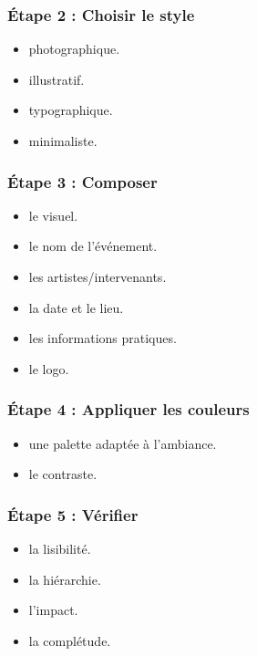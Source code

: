 \subsubsection{Étape 2 : Choisir le style}

\begin{itemize}
    \item {} photographique.
    \item {} illustratif.
    \item {} typographique.
    \item {} minimaliste.
\end{itemize}

\subsubsection{Étape 3 : Composer}

\begin{itemize}
    \item {} le visuel.
    \item {} le nom de l'événement.
    \item {} les artistes/intervenants.
    \item {} la date et le lieu.
    \item {} les informations pratiques.
    \item {} le logo.
\end{itemize}

\subsubsection{Étape 4 : Appliquer les couleurs}

\begin{itemize}
    \item {} une palette adaptée à l'ambiance.
    \item {} le contraste.
\end{itemize}

\subsubsection{Étape 5 : Vérifier}

\begin{itemize}
    \item {} la lisibilité.
    \item {} la hiérarchie.
    \item {} l'impact.
    \item {} la complétude.
\end{itemize}

